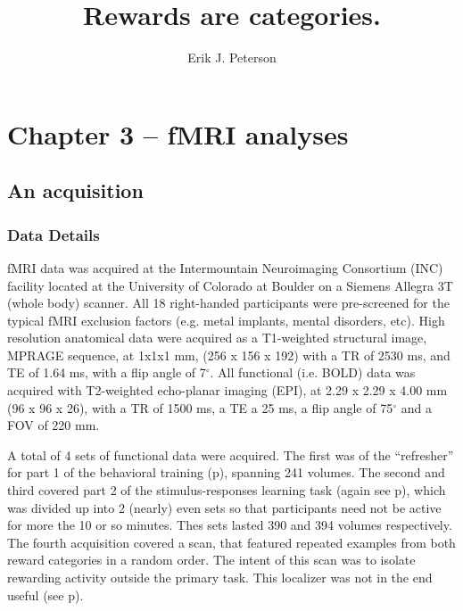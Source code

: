 \documentclass[doc,12pt]{apa}        %
\title{Rewards are categories.}
\author{Erik J. Peterson} \affiliation{Dept. of Psychology \\ Colorado State University \\ Fort Collins, CO}
\begin{document}
 
\maketitle
\doublespacing

\section{Chapter 3 -- fMRI analyses} %
\label{sec:task_and_models}
\subsection{An acquisition}
\label{sub:acquired}
\subsubsection{Data Details}
\label{subsub:datadetails}
fMRI data was acquired at the Intermountain Neuroimaging Consortium (INC) facility located at the University of Colorado at Boulder on a Siemens Allegra 3T (whole body) scanner.  All 18 right-handed participants were pre-screened for the typical fMRI exclusion factors (e.g. metal implants, mental disorders, etc).  High resolution anatomical data were acquired as a T1-weighted structural image, MPRAGE sequence, at 1x1x1 mm, (256 x 156 x 192) with a TR of 2530 ms, and TE of 1.64 ms, with a flip angle of 7$^\circ$.  All functional (i.e. BOLD) data was acquired with T2-weighted echo-planar imaging (EPI), at 2.29 x 2.29 x 4.00 mm (96 x 96 x 26), with a TR of 1500 ms, a TE a 25 ms, a flip angle of 75$^\circ$ and a FOV of 220 mm.

A total of 4 sets of functional data were acquired.  The first was of the ``refresher'' for part 1 of the behavioral training (p\pageref{subsub:whatwhen}), spanning 241 volumes.  The second and third covered part 2 of the stimulus-responses learning task (again see p\pageref{subsub:whatwhen}), which was divided up into 2 (nearly) even sets so that participants need not be active for more the 10 or so minutes.  Thes sets lasted 390 and 394 volumes respectively.  The fourth acquisition covered a scan, that featured repeated examples from both reward categories in a random order.  The intent of this scan was to isolate rewarding activity outside the primary task. This localizer was not in the end useful (see p\pageref{subsub:chunks}).
\end{document}
